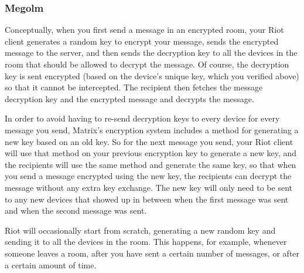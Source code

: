 \subsubsection{Megolm}



Conceptually, when you first send a message in an encrypted room, your Riot client generates a random key to encrypt your message, sends the encrypted message to the server, and then sends the decryption key to all the devices in the room that should be allowed to decrypt the message. Of course, the decryption key is sent encrypted (based on the device's unique key, which you verified above) so that it cannot be intercepted. The recipient then fetches the message decryption key and the encrypted message and decrypts the message.

In order to avoid having to re-send decryption keys to every device for every message you send, Matrix's encryption system includes a method for generating a new key based on an old key. So for the next message you send, your Riot client will use that method on your previous encryption key to generate a new key, and the recipients will use the same method and generate the same key, so that when you send a message encrypted using the new key, the recipients can decrypt the message without any extra key exchange. The new key will only need to be sent to any new devices that showed up in between when the first message was sent and when the second message was sent.

Riot will occasionally start from scratch, generating a new random key and sending it to all the devices in the room. This happens, for example, whenever someone leaves a room, after you have sent a certain number of messages, or after a certain amount of time.

